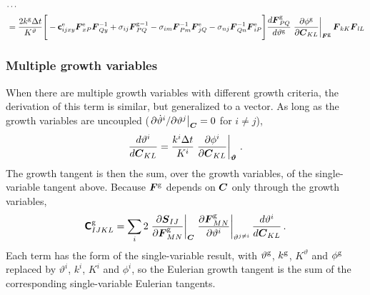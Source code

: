 \documentclass[10pt,letterpaper,oneside]{report}
\newcommand{\ten}[1]{\mbox{\boldmath $#1$}{}}
\newcommand{\tenf}[1]{\mbox{{\sffamily{\bfseries {#1}}}}}
\newcommand{\scas}[1]{\mbox{{\scriptsize{${\rm{#1}}$}}}{}}
\newcommand{\tens}[1]{\mbox{\boldmath{\scriptsize{$#1$}}}{}}
\begin{document}
\begin{align}
\cdots{}& \notag \\
={}& \frac{2 k^{\scas{g}} \Delta t}{K^\vartheta} \Bigg[ - \tenf{c}^{\scas{e}}_{ijxy} \ten{F}^{\scas{e}}_{xP} \ten{F}^{-1}_{Qy} 
+ \sigma_{ij} \ten{F}^{\scas{g}-1}_{PQ} - \sigma_{im} \ten{F}^{-1}_{Pm} \ten{F}^{\scas{e}}_{jQ} - \sigma_{nj} \ten{F}^{-1}_{Qn} \ten{F}^{\scas{e}}_{iP} \Bigg] \frac{d \ten{F}^{\scas{g}}_{PQ} }{d \vartheta^{\scas{g}}} \left. \frac{\partial \phi^{\scas{g}} }{\partial \ten{C}_{KL} } \right|_{\tens{F}^{\scas{g}}} \ten{F}_{kK} \ten{F}_{lL}
\end{align}

\subsubsection{Multiple growth variables}\label{subsec:multi_growth}
When there are multiple growth variables with different growth criteria, the derivation of this term is similar, but generalized to a vector.  
As long as the growth variables are uncoupled ($\left. \partial \dot{\vartheta}^i / \partial \vartheta^j \right|_{\tens{C}} = 0$ for $i\neq j$),
\begin{equation}
\frac{d \vartheta^i }{d \ten{C}_{KL} } 
= \frac{k^i \Delta t}{K^i} \left. \frac{\partial \phi^i }{\partial \ten{C}_{KL} } \right|_{\tens{\vartheta} } \, . 
\end{equation}
The growth tangent is then the sum, over the growth variables, of the single-variable tangent above.
Because $\ten{F}^{\scas{g}}$ depends on $\ten{C}$ only through the growth variables,
\begin{equation}
\tenf{C}^{\scas{g}}_{IJKL} = \sum_i 2 \left. \frac{\partial \ten{S}_{IJ}}{\partial \ten{F}^{\scas{g}}_{MN}} \right|_{\tens{C}} \left. \frac{\partial \ten{F}^{\scas{g}}_{MN}}{\partial \vartheta^i} \right|_{\vartheta^{j \neq i}} \frac{d \vartheta^i}{d \ten{C}_{KL}} \, .
\end{equation}
Each term has the form of the single-variable result, with $\vartheta^{\scas{g}}$, $k^{\scas{g}}$, $K^\vartheta$ and $\phi^{\scas{g}}$ replaced by $\vartheta^i$, $k^i$, $K^i$ and $\phi^i$, so the Eulerian growth tangent is the sum of the corresponding single-variable Eulerian tangents.
\end{document}
